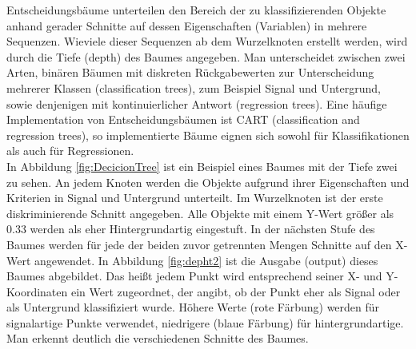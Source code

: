 Entscheidungsb\"aume unterteilen den Bereich der zu klassifizierenden Objekte anhand gerader Schnitte auf dessen Eigenschaften (Variablen) in mehrere Sequenzen. Wieviele dieser Sequenzen ab dem Wurzelknoten erstellt werden, wird durch die Tiefe (depth) des Baumes angegeben. Man unterscheidet zwischen zwei Arten, bin\"aren B\"aumen mit diskreten R\"uckgabewerten zur Unterscheidung mehrerer Klassen (classification trees), zum Beispiel Signal und Untergrund, sowie denjenigen mit kontinuierlicher Antwort (regression trees). \cite{SWB-455193959} Eine h\"aufige Implementation von Entscheidungsb\"aumen ist CART (classification and regression trees), so implementierte B\"aume eignen sich sowohl f\"ur Klassifikationen als auch f\"ur Regressionen.\\
In Abbildung \ref{fig:DecicionTree} ist ein Beispiel eines Baumes mit der Tiefe zwei zu sehen. An jedem Knoten werden die Objekte aufgrund ihrer Eigenschaften und Kriterien in Signal und Untergrund unterteilt. Im Wurzelknoten ist der erste diskriminierende Schnitt angegeben. Alle Objekte mit einem Y-Wert gr\"o\ss er als 0.33 werden als eher Hintergrundartig eingestuft. In der n\"achsten Stufe des Baumes werden f\"ur jede der beiden zuvor getrennten Mengen Schnitte auf den X-Wert angewendet. In Abbildung \ref{fig:depht2} ist die Ausgabe (output) dieses Baumes abgebildet. Das hei\ss t jedem Punkt wird entsprechend seiner X- und Y-Koordinaten ein Wert zugeordnet, der angibt, ob der Punkt eher als Signal oder als Untergrund klassifiziert wurde. H\"ohere Werte (rote F\"arbung) werden f\"ur signalartige Punkte verwendet, niedrigere (blaue F\"arbung) f\"ur hintergrundartige. Man erkennt deutlich die verschiedenen Schnitte des Baumes.\\

